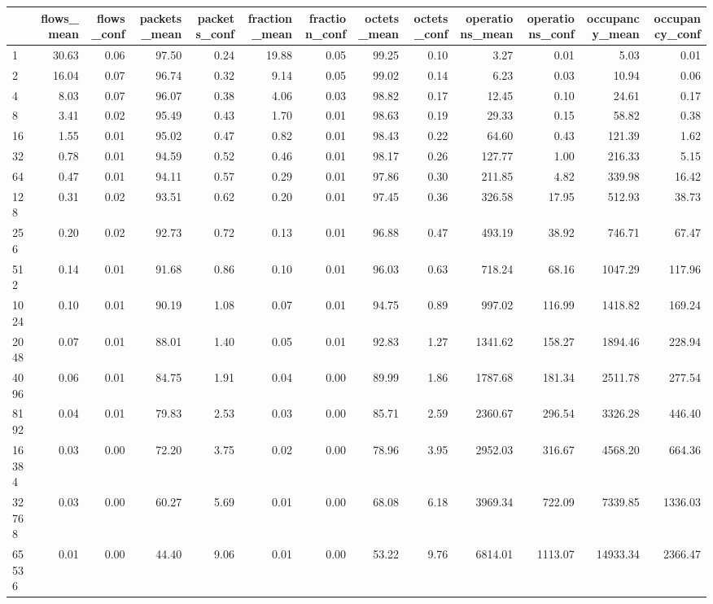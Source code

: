 \begin{tabular}{lrrrrrrrrrrrr}
\toprule
 & flows_mean & flows_conf & packets_mean & packets_conf & fraction_mean & fraction_conf & octets_mean & octets_conf & operations_mean & operations_conf & occupancy_mean & occupancy_conf \\
\midrule
1 & 30.63 & 0.06 & 97.50 & 0.24 & 19.88 & 0.05 & 99.25 & 0.10 & 3.27 & 0.01 & 5.03 & 0.01 \\
2 & 16.04 & 0.07 & 96.74 & 0.32 & 9.14 & 0.05 & 99.02 & 0.14 & 6.23 & 0.03 & 10.94 & 0.06 \\
4 & 8.03 & 0.07 & 96.07 & 0.38 & 4.06 & 0.03 & 98.82 & 0.17 & 12.45 & 0.10 & 24.61 & 0.17 \\
8 & 3.41 & 0.02 & 95.49 & 0.43 & 1.70 & 0.01 & 98.63 & 0.19 & 29.33 & 0.15 & 58.82 & 0.38 \\
16 & 1.55 & 0.01 & 95.02 & 0.47 & 0.82 & 0.01 & 98.43 & 0.22 & 64.60 & 0.43 & 121.39 & 1.62 \\
32 & 0.78 & 0.01 & 94.59 & 0.52 & 0.46 & 0.01 & 98.17 & 0.26 & 127.77 & 1.00 & 216.33 & 5.15 \\
64 & 0.47 & 0.01 & 94.11 & 0.57 & 0.29 & 0.01 & 97.86 & 0.30 & 211.85 & 4.82 & 339.98 & 16.42 \\
128 & 0.31 & 0.02 & 93.51 & 0.62 & 0.20 & 0.01 & 97.45 & 0.36 & 326.58 & 17.95 & 512.93 & 38.73 \\
256 & 0.20 & 0.02 & 92.73 & 0.72 & 0.13 & 0.01 & 96.88 & 0.47 & 493.19 & 38.92 & 746.71 & 67.47 \\
512 & 0.14 & 0.01 & 91.68 & 0.86 & 0.10 & 0.01 & 96.03 & 0.63 & 718.24 & 68.16 & 1047.29 & 117.96 \\
1024 & 0.10 & 0.01 & 90.19 & 1.08 & 0.07 & 0.01 & 94.75 & 0.89 & 997.02 & 116.99 & 1418.82 & 169.24 \\
2048 & 0.07 & 0.01 & 88.01 & 1.40 & 0.05 & 0.01 & 92.83 & 1.27 & 1341.62 & 158.27 & 1894.46 & 228.94 \\
4096 & 0.06 & 0.01 & 84.75 & 1.91 & 0.04 & 0.00 & 89.99 & 1.86 & 1787.68 & 181.34 & 2511.78 & 277.54 \\
8192 & 0.04 & 0.01 & 79.83 & 2.53 & 0.03 & 0.00 & 85.71 & 2.59 & 2360.67 & 296.54 & 3326.28 & 446.40 \\
16384 & 0.03 & 0.00 & 72.20 & 3.75 & 0.02 & 0.00 & 78.96 & 3.95 & 2952.03 & 316.67 & 4568.20 & 664.36 \\
32768 & 0.03 & 0.00 & 60.27 & 5.69 & 0.01 & 0.00 & 68.08 & 6.18 & 3969.34 & 722.09 & 7339.85 & 1336.03 \\
65536 & 0.01 & 0.00 & 44.40 & 9.06 & 0.01 & 0.00 & 53.22 & 9.76 & 6814.01 & 1113.07 & 14933.34 & 2366.47 \\

\end{tabular}
